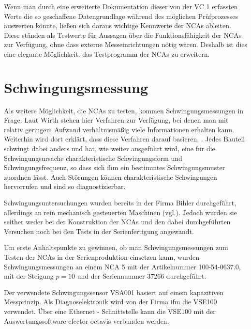 Wenn man durch eine erweiterte Dokumentation dieser von der VC 1 erfassten Werte die so geschaffene Datengrundlage während des möglichen Prüfprozesses auswerten könnte, ließen sich daraus wichtige Kennwerte der NCAs ableiten. Diese ständen als Testwerte für Aussagen über die Funktionsfähigkeit der NCAs zur Verfügung, ohne dass externe Messeinrichtungen nötig wären. Deshalb ist dies eine elegante Möglichkeit, das Testprogramm der NCAs zu erweitern.



\section{Schwingungsmessung}



Als weitere Möglichkeit, die NCAs zu testen, kommen Schwingungsmessungen in Frage. Laut Wirth \cite{Wirth1998} stehen hier Verfahren zur Verfügung, bei denen man mit relativ geringem Aufwand verhältnismäßig viele Informationen erhalten kann. Weiterhin wird dort erklärt, dass diese Verfahren darauf basieren, . Jedes Bauteil schwingt dabei anders und hat, wie weiter ausgeführt wird, eine für die Schwingungsursache charakteristische Schwingungsform und Schwingungsfrequenz, so dass sich ihm ein bestimmtes Schwingungsmuster zuordnen lässt.  Auch Störungen können charakteristische Schwingungen hervorrufen und sind so diagnostizierbar.


Schwingungsuntersuchungen wurden bereits in der Firma Bihler durchgeführt, allerdings an rein mechanisch gesteuerten Maschinen (vgl.\cite{Muenchenbach2012}). Jedoch wurden sie seither weder bei der Konstruktion der NCAs und den dabei durchgeführten Versuchen noch bei den Tests in der Serienfertigung angewandt.


Um erste Anhaltspunkte zu gewinnen, ob man Schwingungsmessungen zum Testen der NCAs in der Serienproduktion einsetzen kann, wurden Schwingungsmessungen an einem NCA 5 mit der Artikelnummer 100-54-0637.0, mit der Steigung $p = \num{10}$ und der Seriennummer 37266 durchgeführt.


Der verwendete Schwingungssensor VSA001 basiert auf einem kapazitiven Messprinzip. Als Diagnoselektronik wird von der Firma ifm die VSE100 verwendet. Über eine Ethernet - Schnittstelle kann die VSE100 mit der Auswertungssoftware efector octavis verbunden werden.







